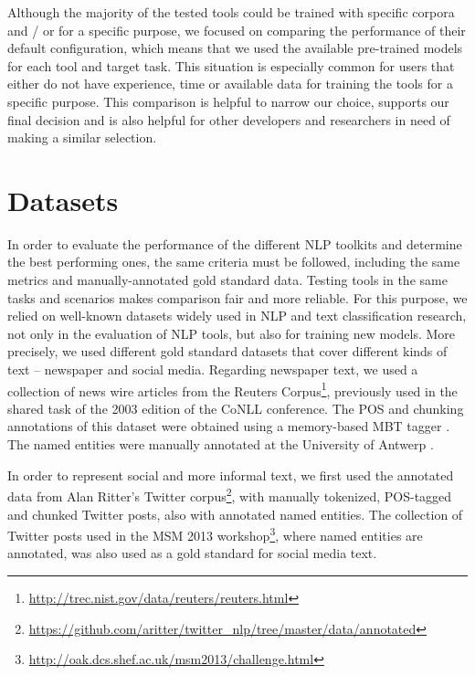 Although the majority of the tested tools could be trained with specific corpora and / or for a specific purpose, we focused on comparing the performance of their default configuration, which means that we used the available pre-trained models for each tool and target task.
This situation is especially common for users that either do not have experience, time or available data for training the tools for a specific purpose.
This comparison is helpful to narrow our choice, supports our final decision and is also helpful for other developers and researchers in need of making a similar selection.

\section{Datasets}

In order to evaluate the performance of the different NLP toolkits and determine the best performing ones, the same criteria must be followed, including the same metrics and manually-annotated gold standard data.
Testing tools in the same tasks and scenarios makes comparison fair and more reliable.
For this purpose, we relied on well-known datasets widely used in NLP and text classification research, not only in the evaluation of NLP tools, but also for training new models.
More precisely, we used different gold standard datasets that cover different kinds of text -- newspaper and social media.
Regarding newspaper text, we used a collection of news wire articles from the Reuters Corpus\footnote{\url{http://trec.nist.gov/data/reuters/reuters.html}}, previously used in the shared task of the 2003 edition of the CoNLL conference. The POS and chunking annotations of this dataset were obtained using a memory-based MBT tagger \citep{daelemansMBT1996}. The named entities were manually annotated at the University of Antwerp \citep{TjongCoNLL2003}.

In order to represent social and more informal text, we first used the annotated data from Alan Ritter's Twitter corpus\footnote{\url{https://github.com/aritter/twitter_nlp/tree/master/data/annotated}}, with manually tokenized, POS-tagged and chunked Twitter posts, also with annotated named entities.
The collection of Twitter posts used in the MSM 2013 workshop\footnote{\url{http://oak.dcs.shef.ac.uk/msm2013/challenge.html}}, where named entities are annotated, was also used as a gold standard for social media text.

